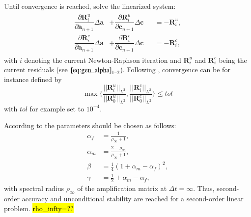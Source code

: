 Until convergence is reached, solve the linearized system:
\begin{equation} \label{eq:NewtonRaphson}
	\begin{aligned}
	\begin{alignedat}{2}
		\dfrac{\partial\mathbf{R}_{i}^{u}}{\partial\mathbf{a}_{n+1}}\Delta \mathbf{a} &+ \dfrac{\partial\mathbf{R}_{i}^{u}}{\partial\mathbf{c}_{n+1}}\Delta\mathbf{c} &&= -\mathbf{R}_{i}^{u}, \\
		\dfrac{\partial\mathbf{R}_{i}^{c}}{\partial\mathbf{a}_{n+1}}\Delta \mathbf{a} &+ \dfrac{\partial\mathbf{R}_{i}^{c}}{\partial\mathbf{c}_{n+1}}\Delta\mathbf{c} &&= -\mathbf{R}_{i}^{c},
	\end{alignedat}
	\end{aligned}
\end{equation}
with $i$ denoting the current Newton-Raphson iteration and $\mathbf{R}_{i}^{u}$ and $\mathbf{R}_{i}^{c}$ being the current residuals (see $\eqref{eq:gen_alpha}_{1-2}$). Following \citet{01_PF_dyn_brittle}, convergence can be for instance defined by
\begin{equation} \label{eq:conv_cond}
	\max\{\frac{||\mathbf{R}_{i}^{u}||_{L^{2}}}{||\mathbf{R}_{0}^{u}||_{L^{2}}},\frac{||\mathbf{R}_{i}^{c}||_{L^{2}}}{||\mathbf{R}_{0}^{c}||_{L^{2}}}\}\leq tol
\end{equation}
with $tol$ for example set to $10^{-4}$.

According to \citet{10_PF_genAlpha} the parameters should be chosen as follows:
\begin{equation}
	\begin{aligned}
		\alpha_{f} &= \frac{1}{\rho_{\infty}+1}, \\
		\alpha_{m} &= \frac{2-\rho_{\infty}}{\rho_{\infty}+1}, \\
		\beta &= \frac{1}{4}\left(1+\alpha_{m}-\alpha_{f}\right)^{2}, \\
		\gamma &= \frac{1}{2}+\alpha_{m}-\alpha_{f},
	\end{aligned}
\end{equation}
with spectral radius $\rho_{\infty}$ of the amplification matrix at $\Delta t=\infty$. Thus, second-order accuracy and unconditional stability are reached for a second-order linear problem. \hl{rho_infty=??}
